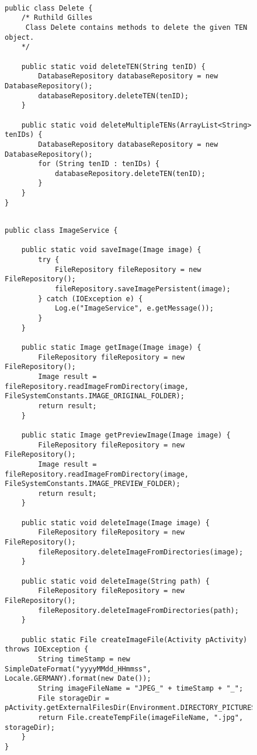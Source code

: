 \begin{figure}[H]
\begin{lstlisting}[caption=Delete (Ruthild Gilles)]

public class Delete {
    /* Ruthild Gilles
     Class Delete contains methods to delete the given TEN object.
    */

    public static void deleteTEN(String tenID) {
        DatabaseRepository databaseRepository = new DatabaseRepository();
        databaseRepository.deleteTEN(tenID);
    }

    public static void deleteMultipleTENs(ArrayList<String> tenIDs) {
        DatabaseRepository databaseRepository = new DatabaseRepository();
        for (String tenID : tenIDs) {
            databaseRepository.deleteTEN(tenID);
        }
    }
}
\end{lstlisting}
\end{figure}

\begin{figure}[H]
\begin{lstlisting}[caption=ImageService (Ruthild Gilles)]

public class ImageService {

    public static void saveImage(Image image) {
        try {
            FileRepository fileRepository = new FileRepository();
            fileRepository.saveImagePersistent(image);
        } catch (IOException e) {
            Log.e("ImageService", e.getMessage());
        }
    }

    public static Image getImage(Image image) {
        FileRepository fileRepository = new FileRepository();
        Image result = fileRepository.readImageFromDirectory(image, FileSystemConstants.IMAGE_ORIGINAL_FOLDER);
        return result;
    }

    public static Image getPreviewImage(Image image) {
        FileRepository fileRepository = new FileRepository();
        Image result = fileRepository.readImageFromDirectory(image, FileSystemConstants.IMAGE_PREVIEW_FOLDER);
        return result;
    }

    public static void deleteImage(Image image) {
        FileRepository fileRepository = new FileRepository();
        fileRepository.deleteImageFromDirectories(image);
    }

    public static void deleteImage(String path) {
        FileRepository fileRepository = new FileRepository();
        fileRepository.deleteImageFromDirectories(path);
    }

    public static File createImageFile(Activity pActivity) throws IOException {
        String timeStamp = new SimpleDateFormat("yyyyMMdd_HHmmss", Locale.GERMANY).format(new Date());
        String imageFileName = "JPEG_" + timeStamp + "_";
        File storageDir = pActivity.getExternalFilesDir(Environment.DIRECTORY_PICTURES);
        return File.createTempFile(imageFileName, ".jpg", storageDir);
    }
}
\end{lstlisting}
\end{figure}

